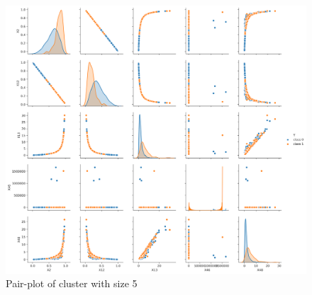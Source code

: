 \documentclass[twoside,11pt]{article}
\begin{document}
\begin{figure}
    \centering
    \includegraphics[scale = 0.4]{Figures/Empirical/cluster size5.png}
    \caption{Pair-plot of cluster with size 5}
    \label{cluster_size5}
\end{figure}
\end{document}
